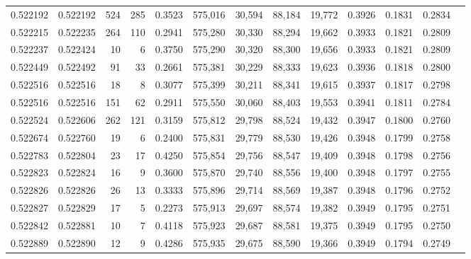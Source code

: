 \begin{tabular}{rrrrrrrrrrrrr}
0.522192 & 0.522192 &   524 &   285 &                                     0.3523 & 575,016 &  30,594 &  88,184 &  19,772 & 0.3926 & 0.1831 & 0.2834 \\
0.522215 & 0.522235 &   264 &   110 &                                     0.2941 & 575,280 &  30,330 &  88,294 &  19,662 & 0.3933 & 0.1821 & 0.2809 \\
0.522237 & 0.522424 &    10 &     6 &                                     0.3750 & 575,290 &  30,320 &  88,300 &  19,656 & 0.3933 & 0.1821 & 0.2809 \\
0.522449 & 0.522492 &    91 &    33 &                                     0.2661 & 575,381 &  30,229 &  88,333 &  19,623 & 0.3936 & 0.1818 & 0.2800 \\
0.522516 & 0.522516 &    18 &     8 &                                     0.3077 & 575,399 &  30,211 &  88,341 &  19,615 & 0.3937 & 0.1817 & 0.2798 \\
0.522516 & 0.522516 &   151 &    62 &                                     0.2911 & 575,550 &  30,060 &  88,403 &  19,553 & 0.3941 & 0.1811 & 0.2784 \\
0.522524 & 0.522606 &   262 &   121 &                                     0.3159 & 575,812 &  29,798 &  88,524 &  19,432 & 0.3947 & 0.1800 & 0.2760 \\
0.522674 & 0.522760 &    19 &     6 &                                     0.2400 & 575,831 &  29,779 &  88,530 &  19,426 & 0.3948 & 0.1799 & 0.2758 \\
0.522783 & 0.522804 &    23 &    17 &                                     0.4250 & 575,854 &  29,756 &  88,547 &  19,409 & 0.3948 & 0.1798 & 0.2756 \\
0.522823 & 0.522824 &    16 &     9 &                                     0.3600 & 575,870 &  29,740 &  88,556 &  19,400 & 0.3948 & 0.1797 & 0.2755 \\
0.522826 & 0.522826 &    26 &    13 &                                     0.3333 & 575,896 &  29,714 &  88,569 &  19,387 & 0.3948 & 0.1796 & 0.2752 \\
0.522827 & 0.522829 &    17 &     5 &                                     0.2273 & 575,913 &  29,697 &  88,574 &  19,382 & 0.3949 & 0.1795 & 0.2751 \\
0.522842 & 0.522881 &    10 &     7 &                                     0.4118 & 575,923 &  29,687 &  88,581 &  19,375 & 0.3949 & 0.1795 & 0.2750 \\
0.522889 & 0.522890 &    12 &     9 &                                     0.4286 & 575,935 &  29,675 &  88,590 &  19,366 & 0.3949 & 0.1794 & 0.2749 \\

\end{tabular}
